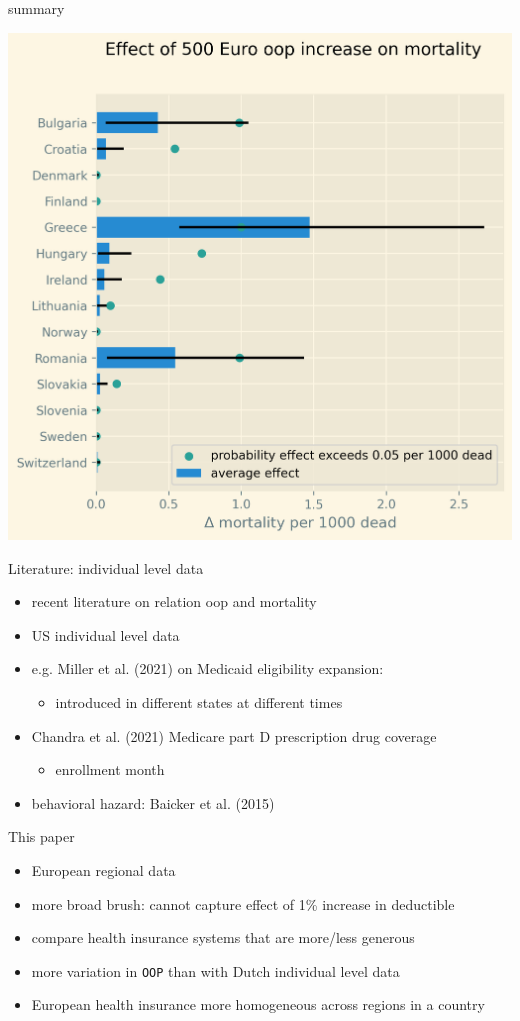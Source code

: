 \documentclass[presentation]{beamer}
\begin{document}
\begin{frame}[label={sec:orge81aa8a}]{summary}
\begin{center}
\includegraphics[width=0.6\linewidth]{./figures/change_mortality_countries_baseline.png}
\label{fig:SummaryFigure}
\end{center}
\end{frame}



\begin{frame}[label={sec:orgc683a04}]{Literature: individual level data}
\begin{itemize}
\item recent literature on relation oop and mortality
\item US individual level data
\item e.g. Miller et al. (2021) on Medicaid eligibility expansion:
\begin{itemize}
\item introduced in different states at different times
\end{itemize}
\item Chandra et al. (2021) Medicare part D prescription drug coverage
\begin{itemize}
\item enrollment month
\end{itemize}
\item behavioral hazard: Baicker et al. (2015)
\end{itemize}
\end{frame}

\begin{frame}[label={sec:org31d998a},fragile]{This paper}
 \begin{itemize}
\item European regional data
\item more broad brush: cannot capture effect of 1\% increase in deductible
\item compare health insurance systems that are more/less generous
\item more variation in \texttt{OOP} than with Dutch individual level data
\item European health insurance more homogeneous across regions in a country
\end{itemize}
\end{frame}
\end{document}
